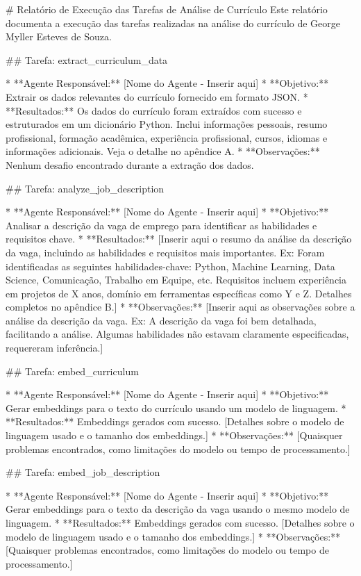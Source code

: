 # Relatório de Execução das Tarefas de Análise de Currículo
Este relatório documenta a execução das tarefas realizadas na análise do currículo de George Myller Esteves de Souza.

## Tarefa: extract_curriculum_data

* **Agente Responsável:**  [Nome do Agente - Inserir aqui]
* **Objetivo:** Extrair os dados relevantes do currículo fornecido em formato JSON.
* **Resultados:** Os dados do currículo foram extraídos com sucesso e estruturados em um dicionário Python.  Inclui informações pessoais, resumo profissional, formação acadêmica, experiência profissional, cursos, idiomas e informações adicionais. Veja o detalhe no apêndice A.
* **Observações:** Nenhum desafio encontrado durante a extração dos dados.

## Tarefa: analyze_job_description

* **Agente Responsável:** [Nome do Agente - Inserir aqui]
* **Objetivo:** Analisar a descrição da vaga de emprego para identificar as habilidades e requisitos chave.
* **Resultados:**  [Inserir aqui o resumo da análise da descrição da vaga, incluindo as habilidades e requisitos mais importantes. Ex:  Foram identificadas as seguintes habilidades-chave: Python, Machine Learning, Data Science,  Comunicação, Trabalho em Equipe, etc.  Requisitos incluem experiência em projetos de X anos, domínio em ferramentas específicas como Y e Z.  Detalhes completos no apêndice B.]
* **Observações:** [Inserir aqui as observações sobre a análise da descrição da vaga. Ex: A descrição da vaga foi bem detalhada, facilitando a análise.  Algumas habilidades não estavam claramente especificadas, requereram inferência.]

## Tarefa: embed_curriculum

* **Agente Responsável:** [Nome do Agente - Inserir aqui]
* **Objetivo:** Gerar embeddings para o texto do currículo usando um modelo de linguagem.
* **Resultados:** Embeddings gerados com sucesso.  [Detalhes sobre o modelo de linguagem usado e o tamanho dos embeddings.]
* **Observações:**  [Quaisquer problemas encontrados, como limitações do modelo ou tempo de processamento.]

## Tarefa: embed_job_description

* **Agente Responsável:** [Nome do Agente - Inserir aqui]
* **Objetivo:** Gerar embeddings para o texto da descrição da vaga usando o mesmo modelo de linguagem.
* **Resultados:** Embeddings gerados com sucesso.  [Detalhes sobre o modelo de linguagem usado e o tamanho dos embeddings.]
* **Observações:** [Quaisquer problemas encontrados, como limitações do modelo ou tempo de processamento.]

